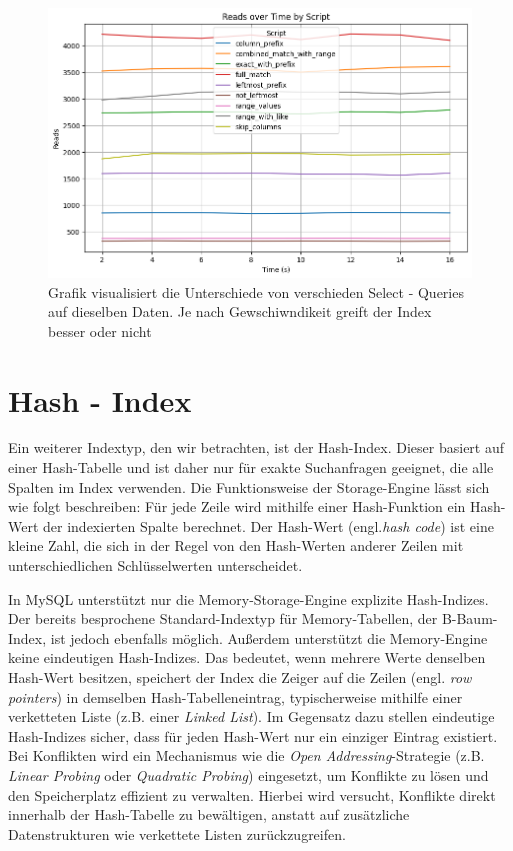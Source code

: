 \begin{figure}[!ht]
    \centering
    \includegraphics[width=.8\textwidth]{PNGs/Script/Index/B_Tree/b-tree-query-differences/Reads}
    \caption[B - Tree - Selects - Ergebnis]{Grafik visualisiert die Unterschiede von verschieden Select - Queries auf dieselben Daten. Je nach Gewschiwndikeit greift der Index besser oder nicht }
    \label{fig:b-tree-query-reads}
\end{figure}


\section{Hash - Index}
Ein weiterer Indextyp, den wir betrachten, ist der Hash-Index.
Dieser basiert auf einer Hash-Tabelle und ist daher nur für exakte Suchanfragen geeignet, die alle Spalten im Index verwenden.
Die Funktionsweise der Storage-Engine lässt sich wie folgt beschreiben: Für jede Zeile wird mithilfe einer Hash-Funktion ein Hash-Wert der indexierten Spalte berechnet.
Der Hash-Wert (engl.\textit{hash code}) ist eine kleine Zahl, die sich in der Regel von den Hash-Werten anderer Zeilen mit unterschiedlichen Schlüsselwerten unterscheidet.


In MySQL unterstützt nur die Memory-Storage-Engine explizite Hash-Indizes.
Der bereits besprochene Standard-Indextyp für Memory-Tabellen, der B-Baum-Index, ist jedoch ebenfalls möglich.
Außerdem unterstützt die Memory-Engine keine eindeutigen Hash-Indizes.
Das bedeutet, wenn mehrere Werte denselben Hash-Wert besitzen, speichert der Index die Zeiger auf die Zeilen (engl. \textit{row pointers}) in demselben Hash-Tabelleneintrag, typischerweise mithilfe einer verketteten Liste (z.B. einer \textit{Linked List}).
Im Gegensatz dazu stellen eindeutige Hash-Indizes sicher, dass für jeden Hash-Wert nur ein einziger Eintrag existiert.
Bei Konflikten wird ein Mechanismus wie die \textit{Open Addressing}-Strategie (z.B. \textit{Linear Probing} oder \textit{Quadratic Probing}) eingesetzt, um Konflikte zu lösen und den Speicherplatz effizient zu verwalten.
Hierbei wird versucht, Konflikte direkt innerhalb der Hash-Tabelle zu bewältigen, anstatt auf zusätzliche Datenstrukturen wie verkettete Listen zurückzugreifen.

